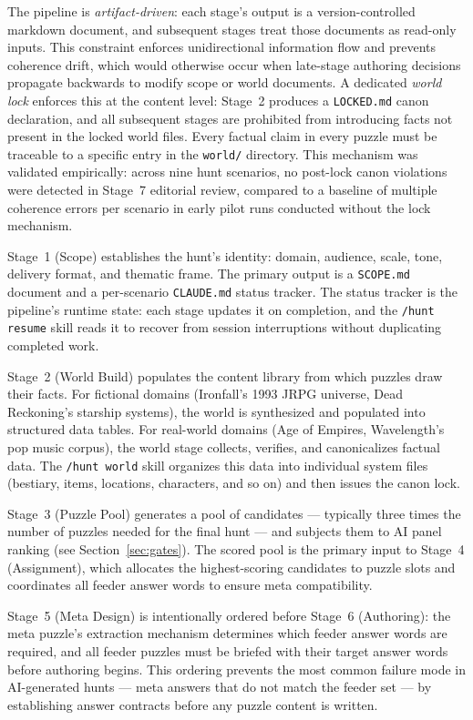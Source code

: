 The pipeline is \emph{artifact-driven}: each stage's output is a version-controlled
markdown document, and subsequent stages treat those documents as read-only inputs. This
constraint enforces unidirectional information flow and prevents coherence drift, which
would otherwise occur when late-stage authoring decisions propagate backwards to modify
scope or world documents. A dedicated \emph{world lock} enforces this at the content level:
Stage~2 produces a \texttt{LOCKED.md} canon declaration, and all subsequent stages are
prohibited from introducing facts not present in the locked world files. Every factual
claim in every puzzle must be traceable to a specific entry in the \texttt{world/}
directory. This mechanism was validated empirically: across nine hunt scenarios, no
post-lock canon violations were detected in Stage~7 editorial review, compared to a
baseline of multiple coherence errors per scenario in early pilot runs conducted without
the lock mechanism.

Stage~1 (Scope) establishes the hunt's identity: domain, audience, scale, tone, delivery
format, and thematic frame. The primary output is a \texttt{SCOPE.md} document and a
per-scenario \texttt{CLAUDE.md} status tracker. The status tracker is the pipeline's
runtime state: each stage updates it on completion, and the \texttt{/hunt resume} skill
reads it to recover from session interruptions without duplicating completed work.

Stage~2 (World Build) populates the content library from which puzzles draw their
facts. For fictional domains (Ironfall's 1993 JRPG universe, Dead Reckoning's
starship systems), the world is synthesized and populated into structured data tables.
For real-world domains (Age of Empires, Wavelength's pop music corpus), the world
stage collects, verifies, and canonicalizes factual data. The \texttt{/hunt world}
skill organizes this data into individual system files (bestiary, items, locations,
characters, and so on) and then issues the canon lock.

Stage~3 (Puzzle Pool) generates a pool of candidates --- typically three times the
number of puzzles needed for the final hunt --- and subjects them to AI panel ranking
(see Section~\ref{sec:gates}). The scored pool is the primary input to Stage~4
(Assignment), which allocates the highest-scoring candidates to puzzle slots and
coordinates all feeder answer words to ensure meta compatibility.

Stage~5 (Meta Design) is intentionally ordered before Stage~6 (Authoring): the meta
puzzle's extraction mechanism determines which feeder answer words are required, and
all feeder puzzles must be briefed with their target answer words before authoring
begins. This ordering prevents the most common failure mode in AI-generated hunts ---
meta answers that do not match the feeder set --- by establishing answer contracts
before any puzzle content is written.

